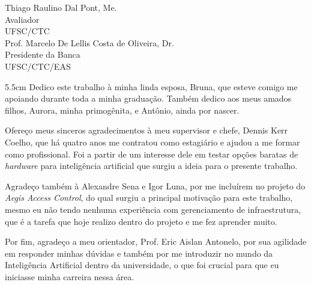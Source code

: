 \begin{folhadeaprovacao}
	\vspace*{2\baselineskip}
	Thiago Raulino Dal Pont, Me.\\
	Avaliador \\
	UFSC/CTC\\
	
	\vspace*{2\baselineskip}
	Prof. Marcelo De Lellis Costa de Oliveira, Dr.\\
	Presidente da Banca \\
	UFSC/CTC/EAS
\end{folhadeaprovacao}

\begin{dedicatoria}
	\vspace*{\fill}
	\noindent
	\begin{adjustwidth*}{}{5.5cm} 
		\raggedleft       
		Dedico este trabalho à minha linda esposa, Bruna, que esteve comigo me apoiando durante toda a minha graduação. Também dedico aos meus amados filhos, Aurora, minha primogênita, e Antônio, ainda por nascer.
	\end{adjustwidth*}
\end{dedicatoria}

\begin{agradecimentos}
	Ofereço meus sinceros agradecimentos à meu supervisor e chefe, Dennis Kerr Coelho, que há quatro anos me contratou como estagiário e ajudou a me formar como profissional. Foi a partir de um interesse dele em testar opções baratas de \textit{hardware} para inteligência artificial que surgiu a ideia para o presente trabalho.

	Agradeço também à Alexandre Sena e Igor Luna, por me incluírem no projeto do \textit{Aegis Access Control}, do qual surgiu a principal motivação para este trabalho, mesmo eu não tendo nenhuma experiência com gerenciamento de infraestrutura, que é a tarefa que hoje realizo dentro do projeto e me fez aprender muito.

	Por fim, agradeço a meu orientador, Prof. Eric Aislan Antonelo, por sua agilidade em responder minhas dúvidas e também por me introduzir no mundo da Inteligência Artificial dentro da universidade, o que foi crucial para que eu iniciasse minha carreira nessa área.
\end{agradecimentos}


